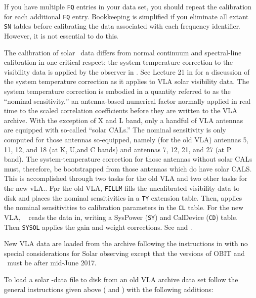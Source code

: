      If you have multiple {\tt FQ} entries in your data set, you
should repeat the calibration for each additional {\tt FQ} entry.
Bookkeeping is simplified if you eliminate all extant {\tt SN} tables
before calibrating the data associated with each frequency identifier.
However, it is not essential to do this.

\vfill\eject
{}

     The calibration of solar \uv\ data differs from normal continuum
and spectral-line calibration in one critical respect: the system
temperature correction to the visibility data is applied by the
observer in \hbox{\AIPS}.  See Lecture 21 in {\it {}\/} for a discussion of the system
temperature correction as it applies to VLA solar visibility data.
The system temperature correction is embodied in a quantity referred
to as the ``nominal sensitivity,'' an antenna-based numerical factor
normally applied in real time to the scaled correlation coefficients
before they are written to the VLA archive.  With the exception
of X and L band, only a handful of VLA antennas are equipped with
so-called ``solar CALs.''  The nominal sensitivity is only computed
for those antennas so-equipped, namely (for the old VLA) antennas 5,
11, 12, and 18 (at K, U,and C bands) and antennas 7, 12, 21, and 27
(at P band).  The system-temperature correction for those antennas
without solar CALs must, therefore, be bootstrapped from those
antennas which do have solar CALS\@.  This is accomplished through two
tasks for the old VLA and two other tasks for the new vLA\@..  Fpr the
old VLA, {\tt FILLM} fills the uncalibrated visibility data to disk
and places the nominal sensitivities in a {\tt TY} extension table.
Then, {\tt {}} applies the nominal sensitivities to
calibration parameters in the {\tt CL} table.  For the new VLA, {\tt
{}} reads the data in, writing a SysPower ({\tt SY}) and
CalDevice ({\tt CD}) table.  Then {\tt SYSOL} applies the gain and
weight corrections.  See  and .


     New VLA data are loaded from the archive following the
instructions in  with no special considerations for
Solar observing except that the versions of OBIT and \AIPS\ must be
after mid-June 2017.

  To load a solar \uv-data file to disk from an
old VLA archive data set follow the general instructions given above
( and ) with the following additions:

